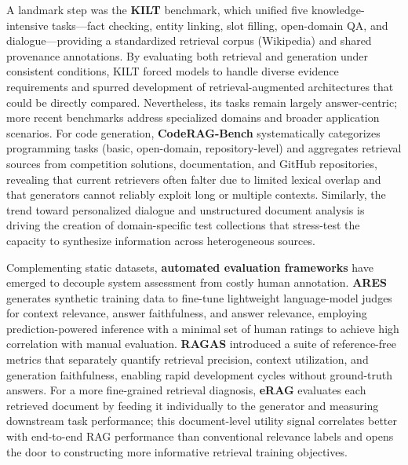 \documentclass[11pt,a4paper]{article}
\begin{document}
A landmark step was the \textbf{KILT} benchmark, which unified five knowledge-intensive tasks---fact checking, entity linking, slot filling, open-domain QA, and dialogue---providing a standardized retrieval corpus (Wikipedia) and shared provenance annotations. By evaluating both retrieval and generation under consistent conditions, KILT forced models to handle diverse evidence requirements and spurred development of retrieval-augmented architectures that could be directly compared. Nevertheless, its tasks remain largely answer-centric; more recent benchmarks address specialized domains and broader application scenarios. For code generation, \textbf{CodeRAG-Bench} \cite{arxiv:2406.14497v1} systematically categorizes programming tasks (basic, open-domain, repository-level) and aggregates retrieval sources from competition solutions, documentation, and GitHub repositories, revealing that current retrievers often falter due to limited lexical overlap and that generators cannot reliably exploit long or multiple contexts. Similarly, the trend toward personalized dialogue and unstructured document analysis is driving the creation of domain-specific test collections that stress-test the capacity to synthesize information across heterogeneous sources.

Complementing static datasets, \textbf{automated evaluation frameworks} have emerged to decouple system assessment from costly human annotation. \textbf{ARES} \cite{arxiv:2311.09476v2} generates synthetic training data to fine-tune lightweight language-model judges for context relevance, answer faithfulness, and answer relevance, employing prediction-powered inference with a minimal set of human ratings to achieve high correlation with manual evaluation. \textbf{RAGAS} \cite{arxiv:2309.15217v1} introduced a suite of reference-free metrics that separately quantify retrieval precision, context utilization, and generation faithfulness, enabling rapid development cycles without ground-truth answers. For a more fine-grained retrieval diagnosis, \textbf{eRAG} \cite{arxiv:2404.13781v1} evaluates each retrieved document by feeding it individually to the generator and measuring downstream task performance; this document-level utility signal correlates better with end-to-end RAG performance than conventional relevance labels and opens the door to constructing more informative retrieval training objectives.
\end{document}
